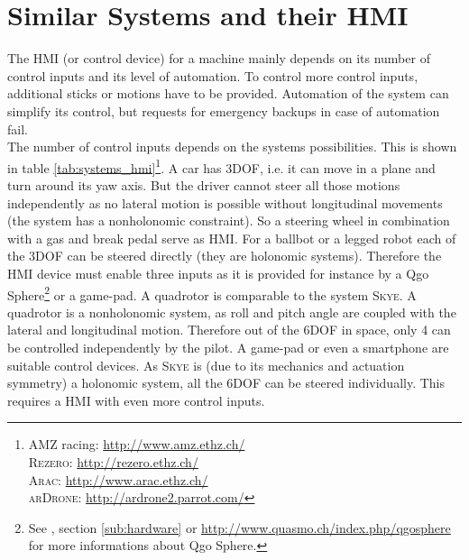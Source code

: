 \section{Similar Systems and their HMI}
\label{sec:similar systems}
The HMI (or control device) for a machine mainly depends on its number of control inputs and its level of automation. To control more control inputs, additional sticks or motions have to be provided. Automation of the system can simplify its control, but requests for emergency backups in case of automation fail. \\
The number of control inputs depends on the systems possibilities. This is shown in table \ref{tab:systems_hmi}\footnote{\textsc{AMZ} racing: \url{http://www.amz.ethz.ch/} \\ \textsc{Rezero}: \url{http://rezero.ethz.ch/} \\ \textsc{Arac}: \url{http://www.arac.ethz.ch/} \\ \textsc{arDrone}: \url{http://ardrone2.parrot.com/}}. A car has 3DOF, i.e. it can move in a plane and turn around its yaw axis. But the driver cannot steer all those motions independently as no lateral motion is possible without longitudinal movements (the system has a nonholonomic constraint). So a steering wheel in combination with a gas and break pedal serve as HMI. For a ballbot or a legged robot each of the 3DOF can be steered directly (they are holonomic systems). Therefore the HMI device must enable three inputs as it is provided for instance by a Qgo Sphere\footnote{See \cite{kammermann}, section \ref{sub:hardware} or \url{http://www.quasmo.ch/index.php/qgosphere} for more informations about Qgo Sphere.} or a game-pad. A quadrotor is comparable to the system \textsc{Skye}. A quadrotor is a nonholonomic system, as roll and pitch angle are coupled with the lateral and longitudinal motion. Therefore out of the 6DOF in space, only 4 can be controlled independently by the pilot. A game-pad or even a smartphone are suitable control devices. As \textsc{Skye} is (due to its mechanics and actuation symmetry) a holonomic system, all the 6DOF can be steered individually. This requires a HMI with even more control inputs.
